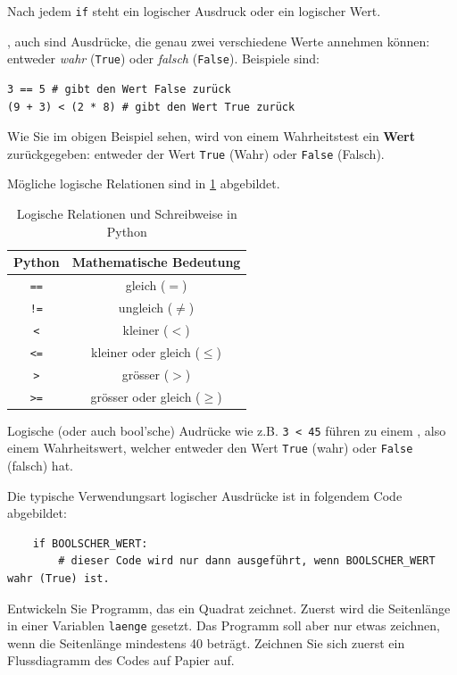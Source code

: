 Nach jedem \lstinline|if| steht ein logischer Ausdruck oder ein logischer Wert.

\begin{mydefinition}
, auch  sind Ausdrücke, die genau zwei verschiedene Werte annehmen können: entweder \textit{wahr} (\lstinline|True|) oder \textit{falsch} (\lstinline|False|). Beispiele sind:
\begin{lstlisting}
3 == 5 # gibt den Wert False zurück
(9 + 3) < (2 * 8) # gibt den Wert True zurück
\end{lstlisting}

Wie Sie im obigen Beispiel sehen, wird von einem Wahrheitstest ein \textbf{Wert} zurückgegeben: entweder der Wert \lstinline|True| (Wahr) oder \lstinline|False| (Falsch).

Mögliche logische Relationen sind in \cref{table:bool} abgebildet.
\begin{table}[H]
	\centering
	\begin{tabular}{c||c}
		\textbf{Python} & \textbf{Mathematische Bedeutung} \\\midrule
		\lstinline|==|  & gleich ($=$)                     \\
		\lstinline|!=|  & ungleich ($\neq$)                \\
		\lstinline|<|   & kleiner ($<$)                    \\
		\lstinline|<=|  & kleiner oder gleich ($\leq$)     \\
		\lstinline|>|   & grösser ($>$)                    \\
		\lstinline|>=|  & grösser oder gleich ($\geq$)
	\end{tabular}
	\caption{Logische Relationen und Schreibweise in Python}
	\label{table:bool}
\end{table}
Logische (oder auch bool'sche) Audrücke wie z.B. \lstinline|3 < 45| führen zu einem , also einem Wahrheitswert, welcher entweder den Wert \lstinline|True| (wahr) oder \lstinline|False| (falsch) hat.

Die typische Verwendungsart logischer Ausdrücke ist in folgendem Code abgebildet:
\begin{lstlisting}
	if BOOLSCHER_WERT:
		# dieser Code wird nur dann ausgeführt, wenn BOOLSCHER_WERT wahr (True) ist.
\end{lstlisting}
\end{mydefinition}



\begin{myexercise}
	Entwickeln Sie Programm, das ein Quadrat zeichnet. Zuerst wird die Seitenlänge in einer Variablen \lstinline|laenge| gesetzt. Das Programm soll aber nur etwas zeichnen, wenn die Seitenlänge mindestens 40 beträgt. Zeichnen Sie sich zuerst ein Flussdiagramm des Codes auf Papier auf.
	\begin{myanswer}
		
	\end{myanswer}
\end{myexercise}

